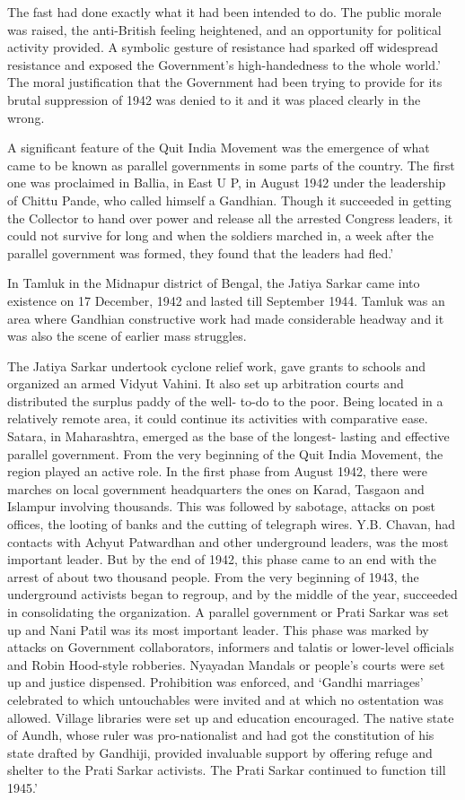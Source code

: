 The fast had done exactly what it had been intended to do. The public morale was raised, the anti-British feeling heightened, and an opportunity for political activity provided. A symbolic gesture of resistance had sparked off widespread resistance and exposed the Government’s high-handedness to the whole world.’ The moral justification that the Government had been trying to provide for its brutal suppression of 1942 was denied to it and it was placed clearly in the wrong.

A significant feature of the Quit India Movement was the emergence of what came to be known as parallel governments in some parts of the country. The first one was proclaimed in Ballia, in East U P, in August 1942 under the leadership of Chittu Pande, who called himself a Gandhian. Though it succeeded in getting the Collector to hand over power and release all the arrested Congress leaders, it could not survive for long and when the soldiers marched in, a week after the parallel government was formed, they found that the leaders had fled.’

In Tamluk in the Midnapur district of Bengal, the Jatiya Sarkar came into existence on 17 December, 1942 and lasted till September 1944. Tamluk was an area where Gandhian constructive work had made considerable headway and it was also the scene of earlier mass struggles.

The Jatiya Sarkar undertook cyclone relief work, gave grants to schools and organized an armed Vidyut Vahini. It also set up arbitration courts and distributed the surplus paddy of the well- to-do to the poor. Being located in a relatively remote area, it could continue its activities with comparative ease. Satara, in Maharashtra, emerged as the base of the longest- lasting and effective parallel government. From the very beginning of the Quit India Movement, the region played an active role. In the first phase from August 1942, there were marches on local government headquarters the ones on Karad, Tasgaon and Islampur involving thousands. This was followed by sabotage, attacks on post offices, the looting of banks and the cutting of telegraph wires. Y.B. Chavan, had contacts with Achyut Patwardhan and other underground leaders, was the most important leader. But by the end of 1942, this phase came to an end with the arrest of about two thousand people. From the very beginning of 1943, the underground activists began to regroup, and by the middle of the year, succeeded in consolidating the organization. A parallel government or Prati Sarkar was set up and Nani Patil was its most important leader. This phase was marked by attacks on Government collaborators, informers and talatis or lower-level officials and Robin Hood-style robberies. Nyayadan Mandals or people’s courts were set up and justice dispensed. Prohibition was enforced, and ‘Gandhi marriages’ celebrated to which untouchables were invited and at which no ostentation was allowed. Village libraries were set up and education encouraged. The native state of Aundh, whose ruler was pro-nationalist and had got the constitution of his state drafted by Gandhiji, provided invaluable support by offering refuge and shelter to the Prati Sarkar activists. The Prati Sarkar continued to function till 1945.’

